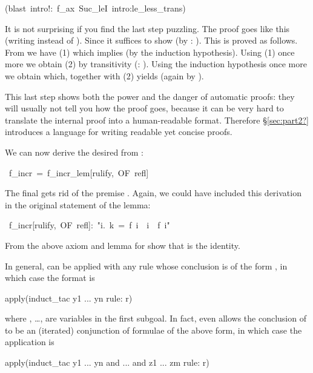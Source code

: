 \begin{isabelle}
\begin{isamarkuptxt}
\begin{isabellepar}
\end{isabellepar}%
\end{isamarkuptxt}%
(blast\ intro!:\ f\_ax\ Suc\_leI\ intro:le\_less\_trans)%
\begin{isamarkuptext}%
\noindent
It is not surprising if you find the last step puzzling.
The proof goes like this (writing  instead of ).
Since  it suffices to show
 (by : ). This is
proved as follows. From  we have 
(1) which implies  (by the induction hypothesis).
Using (1) once more we obtain  (2) by transitivity
(: ).
Using the induction hypothesis once more we obtain 
which, together with (2) yields  (again by
).

This last step shows both the power and the danger of automatic proofs: they
will usually not tell you how the proof goes, because it can be very hard to
translate the internal proof into a human-readable format. Therefore
\S\ref{sec:part2?} introduces a language for writing readable yet concise
proofs.

We can now derive the desired  from :%
\end{isamarkuptext}%
\ f\_incr\ =\ f\_incr\_lem[rulify,\ OF\ refl]%
\begin{isamarkuptext}%
The final  gets rid of the premise . Again, we could
have included this derivation in the original statement of the lemma:%
\end{isamarkuptext}%
\ f\_incr[rulify,\ OF\ refl]:\ {"}{\isasymforall}i.\ k\ =\ f\ i\ {\isasymlongrightarrow}\ i\ {\isasymle}\ f\ i{"}%
\begin{isamarkuptext}%
\begin{exercise}
From the above axiom and lemma for  show that  is the identity.
\end{exercise}

In general,  can be applied with any rule 
whose conclusion is of the form , in which case the
format is
\begin{ttbox}
apply(induct_tac y1 ... yn rule: r)
\end{ttbox}%
where , \dots,  are variables in the first subgoal.
In fact,  even allows the conclusion of
 to be an (iterated) conjunction of formulae of the above form, in
which case the application is
\begin{ttbox}
apply(induct_tac y1 ... yn and ... and z1 ... zm rule: r)
\end{ttbox}


\end{isamarkuptext}
\end{isabelle}
